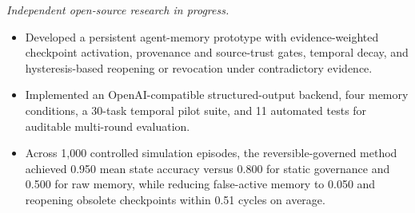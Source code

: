 \textit{Independent open-source research in progress.}
\begin{itemize}
  \item Developed a persistent agent-memory prototype with evidence-weighted checkpoint activation, provenance and source-trust gates, temporal decay, and hysteresis-based reopening or revocation under contradictory evidence.
  \item Implemented an OpenAI-compatible structured-output backend, four memory conditions, a 30-task temporal pilot suite, and 11 automated tests for auditable multi-round evaluation.
  \item Across 1,000 controlled simulation episodes, the reversible-governed method achieved 0.950 mean state accuracy versus 0.800 for static governance and 0.500 for raw memory, while reducing false-active memory to 0.050 and reopening obsolete checkpoints within 0.51 cycles on average.
\end{itemize}
